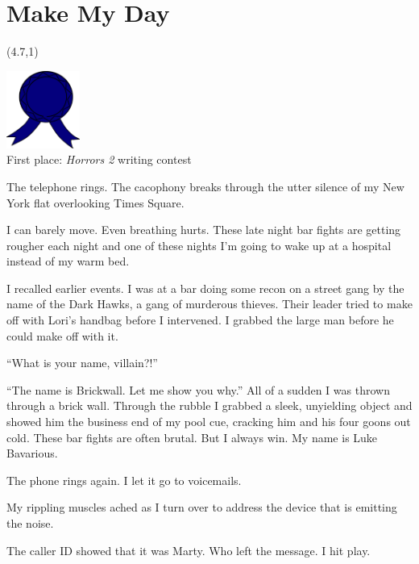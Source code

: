 \chapter{Make My Day}

\begin{textblock}{1.5}(4.7,1)
\begin{center}
\includegraphics[height=1in]{art/blue-ribbon.pdf} \\
{\scriptsize First place: {\em Horrors 2} writing contest}
\end{center}
\end{textblock}

\noindent The telephone rings. The cacophony breaks through the utter silence
of my New York flat overlooking Times Square.

I can barely move. Even breathing hurts. These late night bar
fights are getting rougher each night and one of these nights
I'm going to wake up at a hospital instead of my warm
bed.



I recalled earlier events. I was at a bar doing some recon on a
street gang by the name of the Dark Hawks, a gang of murderous
thieves. Their leader tried to make off with Lori's handbag
before I intervened. I grabbed the large man before he could make
off with it.



``What is your name, villain?!''



``The name is Brickwall. Let me show you why.'' All of a
sudden I was thrown through a brick wall. Through the rubble I
grabbed a sleek, unyielding object and showed him the business end
of my pool cue, cracking him and his four goons out cold. These bar
fights are often brutal. But I always win. My name is Luke
Bavarious.



The phone rings again. I let it go to voicemails.



My rippling muscles ached as I turn over to address the device that
is emitting the noise.

The caller ID showed that it was Marty. Who left the message. I hit
play.



